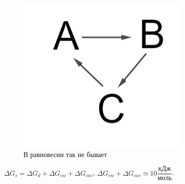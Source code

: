 \begin{lecture}
\begin{lecSection}
\begin{figure}[H]
\begin{minipage}[h]{0.28\linewidth}
		\centering\includegraphics[width=\linewidth]{lecture_05/pic3}
		\caption{В равновесии так не бывает}
	\end{minipage}

	\end{figure}
	$\Delta G_s = \Delta G_d + \Delta G_{vw} + \Delta G_{cav}$, $\Delta G_{vw} + \Delta G_{cav} \simeq 10 \dfrac{\text{кДж}}{\text{моль}}$.
	\end{lecSection}
	
\end{lecture}